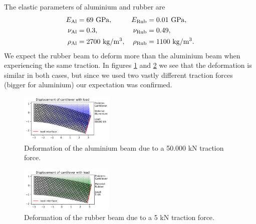\documentclass[acmtog]{acmart}
\begin{document}
The elastic parameters of aluminium and rubber are
%
\begin{align}
  E_\mathrm{Al}    & = 69 \ \mathrm{GPa},      & E_\mathrm{Rub}    & = 0.01 \ \mathrm{GPa},    \notag \\
  \nu_\mathrm{Al}  & = 0.3,                     & \nu_\mathrm{Rub}  & = 0.49,                    \notag \\
  \rho_\mathrm{Al} & = 2700 \ \mathrm{kg/m^3}, & \rho_\mathrm{Rub} & = 1100 \ \mathrm{kg/m^3}. \notag
\end{align}
%
We expect the rubber beam to deform more than the aluminium beam when experiencing the same traction. In figures \ref{fig:w5exp1_0} and \ref{fig:w5exp1_1} we see that the deformation is similar in both cases, but since we used two vastly different traction forces (bigger for aluminium) our expectation was confirmed.
%
\graphicspath{{Images/Week5/exp1/}}
\begin{figure}[H]
  \centering
  \includegraphics[width = 0.4\textwidth]{exp1_0.png}
  \caption{Deformation of the aluminium beam due to a 50.000 kN traction force.\label{fig:w5exp1_0}}
\end{figure}
\begin{figure}[H]
  \centering
  \includegraphics[width = 0.4\textwidth]{exp1_1.png}
  \caption{Deformation of the rubber beam due to a 5 kN traction force.\label{fig:w5exp1_1}}
\end{figure}
%
\vfill
\end{document}
